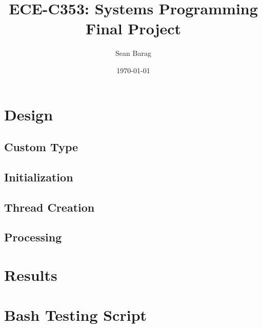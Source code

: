 \documentclass{article}
\title{ECE-C353: Systems Programming \\ Final Project}
\author{Sean Barag \\ \ttt{<sjb89@drexel.edu>}}
\date{\today}
\begin{document}
\maketitle
\section{Design}

\subsection{Custom Type}
\subsection{Initialization}
\subsection{Thread Creation}
\subsection{Processing}
\section{Results}

\appendix
\section{Bash Testing Script}
\end{document}
